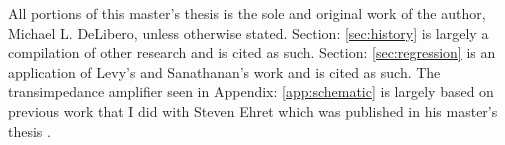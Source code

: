 All portions of this master's thesis is the sole and original work of the author, Michael L. DeLibero, unless otherwise stated. 
Section: \ref{sec:history}  is largely a compilation of other research and is cited as such. 
Section: \ref{sec:regression}  is an application of Levy's\cite{levy} and Sanathanan's\cite{levy_iter} work and is cited as such. 
The transimpedance amplifier seen in Appendix: \ref{app:schematic}  is largely based on previous work that I did with Steven Ehret which was published in his master's thesis \cite{steve_thesis}.

